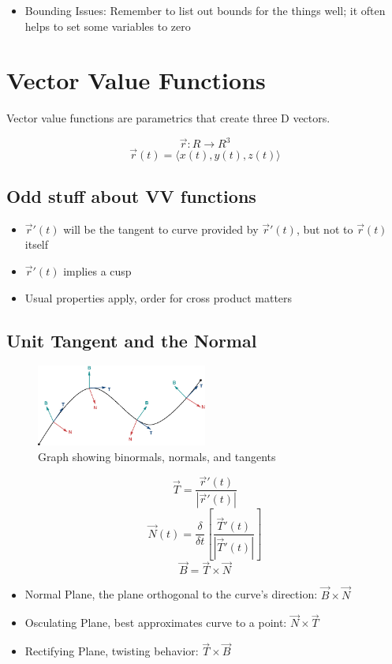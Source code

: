 \documentclass{article}
\begin{document}
\begin{itemize}
    \item Bounding Issues: Remember to list out bounds for the things well; it often helps to set some variables to zero
\end{itemize}

\section{Vector Value Functions}

Vector value functions are parametrics that create three D vectors.

$$\vec{r}: R \to R^3$$
$$\vec{r}(t) = \langle x(t), y(t), z(t) \rangle$$

\subsection{Odd stuff about VV functions}

\begin{itemize}
    \item $\vec{r}'(t)$ will be the tangent to curve provided by $\vec{r}'(t)$, but not to $\vec{r}(t)$ itself
    \item $\vec{r}'(t)$ implies a cusp
    \item Usual properties apply, order for cross product matters
\end{itemize}

\subsection{Unit Tangent and the Normal}

\begin{figure}[H]
    \centering
    \includegraphics[width=0.5\textwidth]{figures/NormalsBinormals.jpeg}
    \caption{Graph showing binormals, normals, and tangents}
\end{figure}

$$\vec{T} = \frac{\vec{r}'(t)}{\left|\vec{r}'(t)\right|}$$
$$\vec{N}(t) = \frac{\delta}{\delta t}\left[\frac{\vec{T}'(t)}{\left|\vec{T}'(t)\right|}\right]$$
$$\vec{B} = \vec{T} \times \vec{N}$$

\begin{itemize}
    \item Normal Plane, the plane orthogonal to the curve's direction: $\vec{B} \times \vec{N}$
    \item Osculating Plane, best approximates curve to a point: $\vec{N} \times \vec{T}$
    \item Rectifying Plane, twisting behavior: $\vec{T} \times \vec{B}$
\end{itemize}
\end{document}
